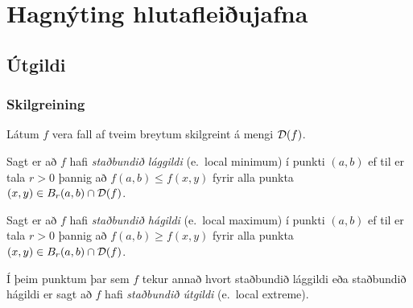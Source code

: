 
\theoremstyle{definition}
\newtheorem{exercise}[theorem]{}





\newbox\mytempbox
\newdimen\mytempdimen

\newcommand\includegraphicscopyright[3][]{%
  \leavevmode\vbox{\vskip3pt\raggedright\setbox\mytempbox=\hbox{\texttt{[image: \#2]}}%
    \mytempdimen=\wd\mytempbox\box\mytempbox\par\vskip1pt%
    \fontsize{3}{3.5}\selectfont{\color{black!25}{\vbox{\hsize=\mytempdimen#3}}}\vskip3pt%
}}

\newenvironment{colortabular}[1]{\medskip\rowcolors[]{1}{blue!20}{blue!10}\tabular{#1}\rowcolor{blue!40}}{\endtabular\medskip}

\def\equad{\leavevmode\hbox{}\quad}

\newenvironment{greencolortabular}[1]
{\medskip\rowcolors[]{1}{green!50!black!20}{green!50!black!10}%
  \tabular{#1}\rowcolor{green!50!black!40}}%
{\endtabular\medskip}




\section{Hagnýting hlutafleiðujafna}

\subsection{Útgildi} 

\subsubsection{Skilgreining }
 Látum $f$ vera fall af tveim breytum
skilgreint á mengi ${\cal D}(f)$.  

\medskip
Sagt er að $f$ hafi {\em \color{red} staðbundið
  lággildi} (e.~local minimum) í punkti $(a,b)$ ef til er tala $r>0$ þannig að 
$f(a,b)\leq f(x,y)$ fyrir alla punkta $(x,y)\in B_r(a,b)\cap{\cal
  D}(f)$.

\medskip
Sagt er að $f$ hafi {\em \color{red} staðbundið
  hágildi}  (e.~local maximum) í punkti $(a,b)$ ef til er tala $r>0$ þannig að 
$f(a,b)\geq f(x,y)$ fyrir alla punkta $(x,y)\in B_r(a,b)\cap{\cal
  D}(f)$.

\medskip
Í þeim punktum þar sem $f$ tekur annað hvort staðbundið lággildi eða
staðbundið hágildi er sagt að $f$ hafi {\em \color{red} staðbundið útgildi}
(e.~local extreme). 


